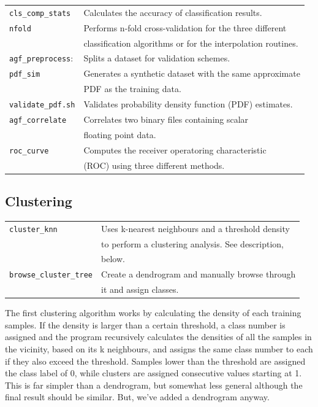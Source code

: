\documentclass[12pt]{article}
\begin{document}
\begin{tabular}{ll}
\verb/cls_comp_stats/ &	Calculates the accuracy of classification results.\\
\verb/nfold/ &	Performs n-fold cross-validation for the three different \\
		    & classification algorithms or for the interpolation routines.\\
\verb/agf_preprocess/: & Splits a dataset for validation schemes.\\
\verb/pdf_sim/ & Generates a synthetic dataset with the same approximate \\
		      & PDF as the training data.\\
\verb/validate_pdf.sh/ & Validates probability density function (PDF) estimates.\\
\verb/agf_correlate/ & Correlates two binary files containing scalar \\
			    & floating point data.\\
\verb/roc_curve/ & Computes the receiver operatoring characteristic \\
		& (ROC) using three different methods.
\end{tabular}

\subsection{Clustering}

\begin{tabular}{ll}
  \verb/cluster_knn/ & Uses k-nearest neighbours and a threshold density\\
		     & to perform a clustering analysis.  See description, \\
	      & below.\\
  \verb/browse_cluster_tree/ &Create a dendrogram and manually browse through\\
		    & it and assign classes.
\end{tabular}

  The first clustering algorithm works by calculating the density of each training samples.  If the density is larger than a certain threshold, a class number is assigned and the program recursively calculates the densities of all the samples in the vicinity, based on its k neighbours, and assigns the same class number to each if they also exceed the threshold.  Samples lower than the threshold are assigned the class label of 0, while clusters are assigned consecutive values starting at 1.  This is far simpler than a dendrogram, but somewhat less general although the final result should be similar.  But, we've added a dendrogram anyway.
\end{document}
